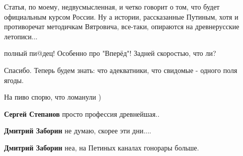 \begin{itemize}
Статья, по моему, недвусмысленная, и четко говорит о том, что будет официальным
курсом России. Ну а истории, рассказанные Путиным, хотя и противоречат
методичкам Вятровича, все-таки, опираются на древнерусские летописи...

 
полный пи@дец! Особенно про "Вперёд"! Задней скоростью, что ли?

 
Спасибо. Теперь будем знать: что адекватники, что свидомые - одного поля ягоды.


\begin{itemize}
 
На пиво спорю, что ломанули )

 
\textbf{Сергей Степанов} просто профессия древнейшая..

 
\textbf{Дмитрий Заборин} не думаю, скорее эти дни....

 
\textbf{Дмитрий Заборин} неа, на Петиных каналах гонорары больше.

 

\end{itemize}
\end{itemize}
